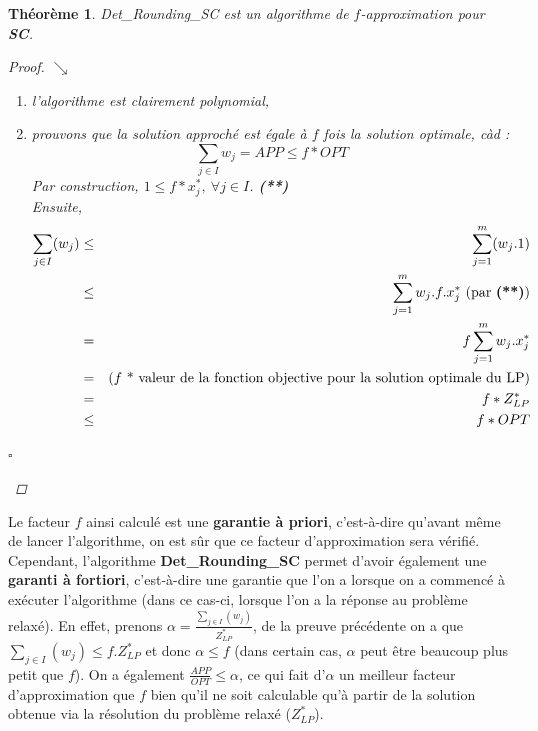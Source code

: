 \documentclass{article}
\newcommand{\titre}[1]{\textcolor{title}{#1}}
\newcommand{\cqfd}{\begin{flushright}$\square$\end{flushright}}
\newtheorem{thm}{Th\'eor\`eme}[section]
\newtheorem{proof}{Preuve}[section]
\begin{document}
\begin{sffamily}
\begin{thm} Det\_Rounding\_SC est un algorithme de $f$-\textit{approximation} pour \textbf{\titre{SC}}.
\begin{proof}$\searrow$\\
\begin{enumerate}
\item[a)] l'algorithme est clairement polynomial,
\item[b)] prouvons que la solution approché est égale à $f$ fois la solution optimale, càd :
$$ \sum_{j\in I} w_j = APP \leq f * OPT  $$
Par construction, $1 \leq f*x^*_j,\ \forall j \in I$. \textbf{(**)}\\
Ensuite,
\begin{eqnarray}
\sum_{j\in I} (w_j) & \leq & \sum_{j=1}^m (w_j.1) \\
				    & \leq & \sum_{j=1}^m w_j . f . x^*_j \text{ (par \textbf{(**)})} \\
				    &   =  & f \sum_{j=1}^m w_j . x^*_j \\
					&   =  & \text{($f$  * valeur de la fonction objective pour la solution optimale du LP)} \\
					&   =  & f * Z_{LP}^* \\
					& \leq & f*OPT
\end{eqnarray}
\end{enumerate}
\cqfd
\end{proof}
\end{thm}

Le facteur $f$ ainsi calculé est une \textbf{garantie à priori}, c'est-à-dire qu'avant même de lancer l'algorithme, on est sûr que ce
facteur d'approximation sera vérifié. Cependant, l'algorithme \textbf{Det\_Rounding\_SC} permet d'avoir également une \textbf{garanti à
fortiori}, c'est-à-dire une garantie que l'on a lorsque on a commencé à exécuter l'algorithme (dans ce cas-ci, lorsque l'on a la réponse
au problème relaxé). En effet, prenons $\alpha = \frac{\sum_{j\in I}(w_j)}{Z^*_{LP}}$, de la preuve précédente on a que $\sum_{j\in I}
(w_j) \leq f.Z^*_{LP}$ et donc $\alpha \leq f$ (dans certain cas, $\alpha$ peut être beaucoup plus petit que $f$). On a également
$\frac{APP}{OPT}\leq \alpha$, ce qui fait d'$\alpha$ un meilleur facteur d'approximation que $f$ bien qu'il ne soit calculable qu'à
partir de la solution obtenue via la résolution du problème relaxé ($Z^*_{LP}$).

\vspace{4em}


\end{sffamily}
\end{document}
